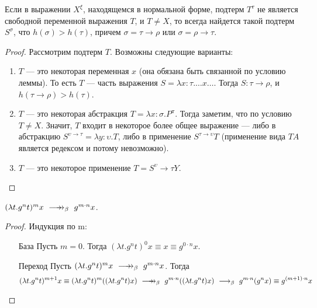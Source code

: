 \begin{lemma}
Если в выражении $X^\xi$, находящемся в нормальной форме,
подтерм $T^\tau$ не является свободной переменной выражения
$T$, и $T \ne X$, то всегда найдется такой подтерм $S^\sigma$, что 
$h(\sigma) > h(\tau)$, причем $\sigma=\tau\rightarrow\rho$ или
$\sigma=\rho\rightarrow\tau$.
\end{lemma}
\begin{proof}
Рассмотрим подтерм $T$. Возможны следующие варианты:

\begin{enumerate}
\item $T$ --- это некоторая переменная $x$ (она обязана быть связанной по условию леммы).
То есть $T$ --- часть выражения $S = \lambda x:\tau. \dots x \dots$. 
Тогда $S: \tau\rightarrow\rho$, и $h(\tau\rightarrow\rho) > h(\tau)$.
\item $T$ --- это некоторая абстракция $T=\lambda x:\sigma.P^\pi$. 
Тогда заметим, что по условию $T \ne X$. Значит, $T$ входит в некоторое более
общее выражение --- либо в абстракцию
$S^{\upsilon\rightarrow\tau} = \lambda y:\upsilon.T$, либо
в применение $S^{\tau\rightarrow\upsilon} T$
(применение вида $T A$ является редексом и потому невозможно).
\item $T$ --- это некоторое применение $T=S^\upsilon\rightarrow\tau Y$.
\end{enumerate}

\end{proof}

\begin{lemma} 
$(\lambda t.g^n t)^m x \ \longrightarrow\!\!\!\!\rightarrow_\beta\  g^{m \cdot n} x$.
\end{lemma}
\begin{proof} Индукция по m:%
\begin{itemize}
\item[База] Пусть $m=0$. Тогда $(\lambda t.g^n t)^0 x \equiv x \equiv g^{0 \cdot n} x$.
\item[Переход] Пусть $(\lambda t.g^n t)^m x \ \longrightarrow\!\!\!\!\rightarrow_\beta\  g^{m \cdot n} x$.
Тогда $$(\lambda t.g^n t)^{m+1} x \equiv (\lambda t.g^n t)^m ((\lambda t.g^n t) x) \ \longrightarrow\!\!\!\!\rightarrow_\beta\  
g^{m \cdot n} ((\lambda t.g^n t) x) \ \longrightarrow_\beta\  g^{m \cdot n} (g^n x) \equiv g^{(m+1) \cdot n} x$$
\end{itemize}
\end{proof}

